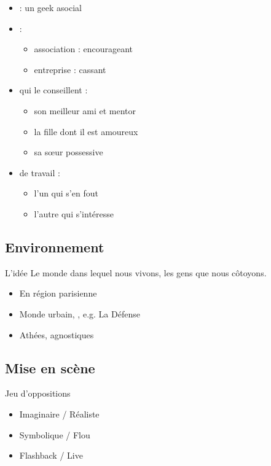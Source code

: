 \documentclass{article}
\begin{document}
        \begin{itemize}
        \item {} : un geek asocial
        \item {} : 
            \begin{itemize}
            \item association : encourageant 
            \item entreprise : cassant
            \end{itemize}
        \item {} qui le conseillent :
            \begin{itemize}
            \item son meilleur ami et mentor
            \item la fille dont il est amoureux
            \item sa s\oe ur possessive
            \end{itemize}
        \item {} de travail :
            \begin{itemize}
            \item l'un qui s'en fout
            \item l'autre qui s'intéresse
            \end{itemize}
        \end{itemize}
    
    \subsection{Environnement}
    
        L'idée
        Le monde dans lequel nous vivons,
        les gens que nous côtoyons.
        
        \begin{itemize}
        \item En région parisienne
        \item Monde urbain, , e.g. La Défense
        \item Athées, agnostiques
        \end{itemize}
        
    \subsection{Mise en scène}
    
        Jeu d'oppositions
            \begin{itemize}
            \item Imaginaire / Réaliste
            \item Symbolique / Flou
            \item Flashback / Live
            \end{itemize}
    
\end{document}
